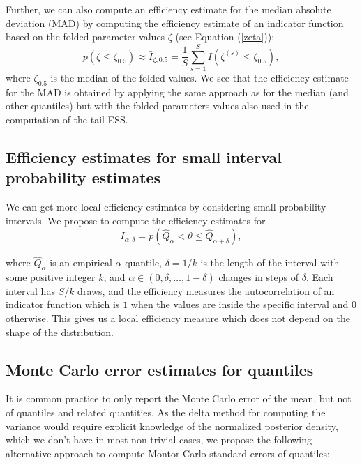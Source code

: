 \documentclass[american,]{article}
\begin{document}
Further, we can also compute an efficiency estimate for the median
absolute deviation (MAD) by computing the efficiency estimate of an
indicator function based on the folded parameter values \(\zeta\) (see
Equation (\ref{zeta})):
\begin{equation}
p(\zeta \leq \zeta_{0.5}) \approx \bar{I}_{\zeta,0.5} = \frac{1}{S}\sum_{s=1}^S
I(\zeta^{(s)} \leq \zeta_{0.5}),
\end{equation}
where \(\zeta_{0.5}\) is the median of the folded values. We see that
the efficiency estimate for the MAD is obtained by applying the same
approach as for the median (and other quantiles) but with the folded
parameters values also used in the computation of the tail-ESS.

\hypertarget{small_interval_S_eff}{%
\subsection{Efficiency estimates for small interval probability
estimates}\label{small_interval_S_eff}}

We can get more local efficiency estimates by considering small
probability intervals. We propose to compute the efficiency estimates
for
\begin{equation}
\bar{I}_{\alpha,\delta} = p(\hat{Q}_\alpha < \theta \leq \hat{Q}_{\alpha+\delta}),
\end{equation}

where \(\hat{Q}_\alpha\) is an empirical \(\alpha\)-quantile,
\(\delta=1/k\) is the length of the interval with some positive integer
\(k\), and \(\alpha \in (0,\delta,\ldots,1-\delta)\) changes in steps of
\(\delta\). Each interval has \(S/k\) draws, and the efficiency measures
the autocorrelation of an indicator function which is \(1\) when the
values are inside the specific interval and \(0\) otherwise. This gives
us a local efficiency measure which does not depend on the shape of the
distribution.

\hypertarget{mcse}{%
\subsection{Monte Carlo error estimates for quantiles}\label{mcse}}

It is common practice to only report the Monte Carlo error of the mean,
but not of quantiles and related quantities. As the delta method for
computing the variance would require explicit knowledge of the
normalized posterior density, which we don't have in most non-trivial
cases, we propose the following alternative approach to compute Montor
Carlo standard errors of quantiles:
\end{document}
